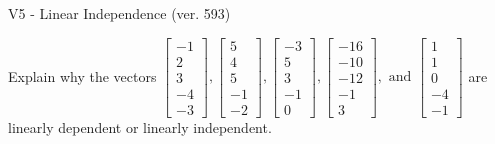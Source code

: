 \begin{exercise}
  \begin{exerciseTitle}V5 - Linear Independence (ver. 593)\end{exerciseTitle}
  \begin{exerciseStatement}
    Explain why the vectors \(\left[\begin{array}{r}
-1 \\
2 \\
3 \\
-4 \\
-3
\end{array}\right] , \left[\begin{array}{r}
5 \\
4 \\
5 \\
-1 \\
-2
\end{array}\right] , \left[\begin{array}{r}
-3 \\
5 \\
3 \\
-1 \\
0
\end{array}\right] , \left[\begin{array}{r}
-16 \\
-10 \\
-12 \\
-1 \\
3
\end{array}\right] , \text{ and } \left[\begin{array}{r}
1 \\
1 \\
0 \\
-4 \\
-1
\end{array}\right]\) are linearly dependent or linearly independent.	



\end{exerciseStatement}
\end{exercise}
